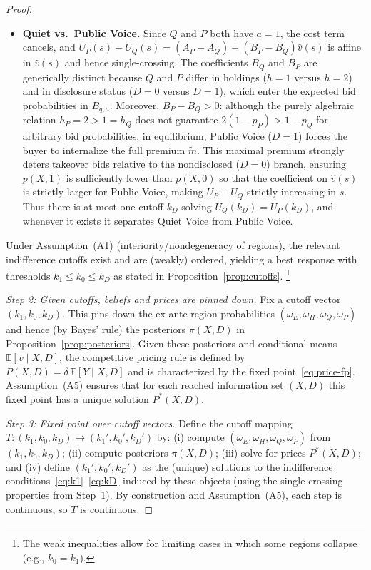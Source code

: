 \documentclass[11pt]{article}
\newcommand{\E}{\mathbb{E}}
\newcommand{\1}{\mathbf{1}}
\begin{document}
\begin{proof}
\begin{itemize}[leftmargin=1.5em,itemsep=2pt]
\begin{equation}
\label{eq:UH-UQ}
\end{equation}
which is weakly increasing in $s$ (strictly increasing when $\chi>0$). Thus there is at most one cutoff $k_0$ solving $U_H(k_0)=U_Q(k_0)$, and whenever it exists it separates Hold from Quiet Voice.
\item \textbf{Quiet vs.\ Public Voice.} Since $Q$ and $P$ both have $a=1$, the cost term cancels, and $U_P(s)-U_Q(s)=(A_P-A_Q)+(B_P-B_Q)\hat v(s)$ is affine in $\hat v(s)$ and hence single-crossing. The coefficients $B_Q$ and $B_P$ are generically distinct because $Q$ and $P$ differ in holdings ($h=1$ versus $h=2$) and in disclosure status ($D=0$ versus $D=1$), which enter the expected bid probabilities in $B_{q,a}$. Moreover, $B_P-B_Q>0$: although the purely algebraic relation $h_P=2>1=h_Q$ does not guarantee $2(1-p_P) > 1-p_Q$ for arbitrary bid probabilities, in equilibrium, Public Voice ($D=1$) forces the buyer to internalize the full premium $\tilde{m}$. This maximal premium strongly deters takeover bids relative to the nondisclosed ($D=0$) branch, ensuring $p(X,1)$ is sufficiently lower than $p(X,0)$ so that the coefficient on $\hat v(s)$ is strictly larger for Public Voice, making $U_P-U_Q$ strictly increasing in $s$. Thus there is at most one cutoff $k_D$ solving $U_Q(k_D)=U_P(k_D)$, and whenever it exists it separates Quiet Voice from Public Voice.
\end{itemize}
Under Assumption~\textup{(A1)} (interiority/nondegeneracy of regions), the relevant indifference cutoffs exist and are (weakly) ordered, yielding a best response with thresholds $k_1\le k_0\le k_D$ as stated in Proposition~\ref{prop:cutoffs}.%
\footnote{The weak inequalities allow for limiting cases in which some regions collapse (e.g., $k_0=k_1$).}

\textit{Step 2: Given cutoffs, beliefs and prices are pinned down.}
Fix a cutoff vector $(k_1,k_0,k_D)$. This pins down the ex ante region probabilities $(\omega_E,\omega_H,\omega_Q,\omega_P)$ and hence (by Bayes' rule) the posteriors $\pi(X,D)$ in Proposition~\ref{prop:posteriors}. Given these posteriors and conditional means $\E[v \mid X,D]$, the competitive pricing rule is defined by $P(X,D)=\delta\,\E[Y \mid X,D]$ and is characterized by the fixed point~\eqref{eq:price-fp}. Assumption~\textup{(A5)} ensures that for each reached information set $(X,D)$ this fixed point has a unique solution $P^*(X,D)$.

\textit{Step 3: Fixed point over cutoff vectors.}
Define the cutoff mapping $T:(k_1,k_0,k_D)\mapsto(k_1',k_0',k_D')$ by: (i) compute $(\omega_E,\omega_H,\omega_Q,\omega_P)$ from $(k_1,k_0,k_D)$; (ii) compute posteriors $\pi(X,D)$; (iii) solve for prices $P^*(X,D)$; and (iv) define $(k_1',k_0',k_D')$ as the (unique) solutions to the indifference conditions~\eqref{eq:k1}--\eqref{eq:kD} induced by these objects (using the single-crossing properties from Step~1). By construction and Assumption~\textup{(A5)}, each step is continuous, so $T$ is continuous.


\end{proof}
\end{document}
